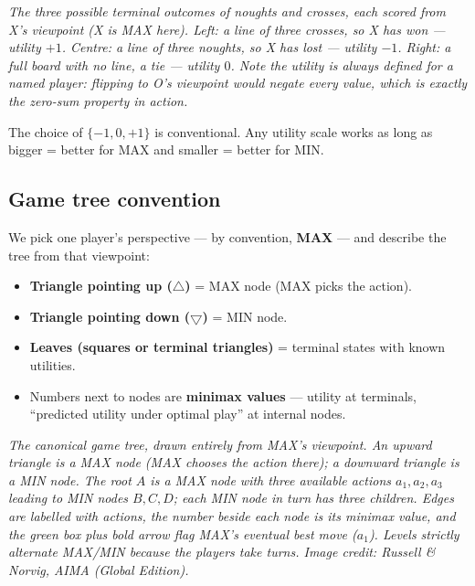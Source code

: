 \documentclass[11pt, a4paper]{article}
\begin{document}
\begin{center}

\footnotesize\textit{The three possible terminal outcomes of noughts and crosses, each scored from X's viewpoint (X is MAX here). Left: a line of three crosses, so X has won --- utility $+1$. Centre: a line of three noughts, so X has lost --- utility $-1$. Right: a full board with no line, a tie --- utility $0$. Note the utility is always defined \emph{for a named player}: flipping to O's viewpoint would negate every value, which is exactly the zero-sum property in action.}
\end{center}

The choice of $\{-1, 0, +1\}$ is conventional. Any utility scale works as long as bigger = better for MAX and smaller = better for MIN.

\subsection{Game tree convention}

We pick one player's perspective — by convention, \textbf{MAX} — and describe the tree from that viewpoint:

\begin{itemize}
  \item \textbf{Triangle pointing up ($\bigtriangleup$)} = MAX node (MAX picks the action).
  \item \textbf{Triangle pointing down ($\bigtriangledown$)} = MIN node.
  \item \textbf{Leaves (squares or terminal triangles)} = terminal states with known utilities.
  \item Numbers next to nodes are \textbf{minimax values} — utility at terminals, ``predicted utility under optimal play'' at internal nodes.
\end{itemize}

\begin{center}

\footnotesize\textit{The canonical game tree, drawn entirely from MAX's viewpoint. An \emph{upward} triangle is a MAX node (MAX chooses the action there); a \emph{downward} triangle is a MIN node. The root $A$ is a MAX node with three available actions $a_1, a_2, a_3$ leading to MIN nodes $B, C, D$; each MIN node in turn has three children. Edges are labelled with actions, the number beside each node is its minimax value, and the green box plus bold arrow flag MAX's eventual best move ($a_1$). Levels strictly alternate MAX/MIN because the players take turns. Image credit: Russell \& Norvig, AIMA (Global Edition).}
\end{center}
\end{document}
